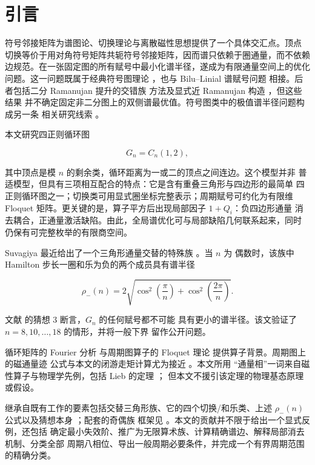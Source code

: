 \section{引言}\label{sec:introduction}

符号邻接矩阵为谱图论、切换理论与离散磁性思想提供了一个具体交汇点。顶点
切换等价于用对角符号矩阵共轭符号邻接矩阵，因而谱只依赖于圈通量，而不依赖
边规范。在一张固定图的所有赋号中最小化谱半径，遂成为有限通量空间上的优化
问题。这一问题既属于经典符号图理论 \cite{Zaslavsky1982}，也与 Bilu--Linial
谱赋号问题 \cite{BiluLinial2006} 相接。后者包括二分 Ramanujan 提升的交错族
方法及显式近 Ramanujan 构造
\cite{MarcusSpielmanSrivastava2015,MohantyODonnellParedes2022}，但这些结果
并不确定固定非二分图上的双侧谱最优值。符号图类中的极值谱半径问题构成另一条
相关研究线索 \cite{BelardoCioabaKoolenWang2019,BelardoBrunettiCiampella2021}。

本文研究四正则循环图

\begin{equation}
G_n=C_n(1,2),
\end{equation}

其中顶点是模 \(n\) 的剩余类，循环距离为一或二的顶点之间连边。这个模型并非
普适模型，但具有三项相互配合的特点：它是含有重叠三角形与四边形的最简单
四正则循环图之一；切换类可用显式圈坐标完整表示；周期赋号可约化为有限维
Floquet 矩阵。更关键的是，算子平方后出现局部因子 \(1+Q_i\)：负四边形通量
消去耦合，正通量激活缺陷。由此，全局谱优化可与局部缺陷几何联系起来，同时
仍保有可完整枚举的有限商空间。

Suvagiya 最近给出了一个三角形通量交替的特殊族
\cite{Suvagiya2026Signed}。当 \(n\) 为
偶数时，该族中 Hamilton 步长一圈和乐为负的两个成员具有谱半径

\begin{equation}
\rho_-(n)=2 \sqrt{\cos^{2}(\frac{\pi}{n})+\cos^{2}(\frac{2\pi}{n})}.
\end{equation}

文献 \cite{Suvagiya2026Signed} 的猜想 3 断言，\(G_n\) 的任何赋号都不可能
具有更小的谱半径。该文验证了 \(n=8,10,\ldots,18\) 的情形，并将一般下界
留作公开问题。

循环矩阵的 Fourier 分析 \cite{Davis1979} 与周期图算子的 Floquet 理论
\cite{Kuchment1993,KorotyaevSaburova2017} 提供算子背景。周期图上的磁通量迹
公式与本文的闭游走矩计算尤为接近 \cite{KorotyaevSaburova2023}。本文所用
“通量相”一词来自磁性算子与物理学先例，包括 Lieb 的定理 \cite{Lieb1994}；
但本文不援引该定理的物理基态原理或假设。

继承自既有工作的要素包括交替三角形族、它的四个切换/和乐类、上述
\(\rho_-(n)\) 公式以及猜想本身 \cite{Suvagiya2026Signed}；配套的奇偶族
框架见 \cite{Suvagiya2026Parity}。本文的贡献并不限于给出一个显式反例，还包括
确定最小失效阶、推广为无限算术族、计算精确谱边、解释局部消去机制、分类全部
周期八相位、导出一般周期必要条件，并完成一个有界周期范围的精确分类。

